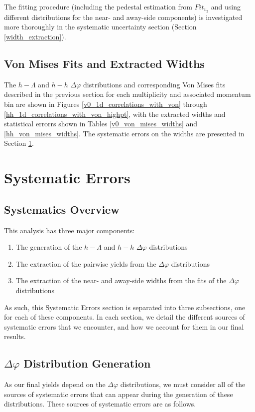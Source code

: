 \documentclass[ALICE,manyauthors]{ALICE_analysis_notes}
\begin{document}
The fitting procedure (including the pedestal estimation from $Fit_{v_{2}}$ and using different distributions for the near- and away-side components) is investigated more thoroughly in the systematic uncertainty section (Section \ref{width_extraction}).

\subsection{Von Mises Fits and Extracted Widths}
\label{von_mises_widths}
The $h-\Lambda$ and $h-h$ $\Delta\varphi$ distributions and corresponding Von Mises fits described in the previous section for each multiplicity and associated momentum bin are shown in Figures \ref{v0_1d_correlations_with_von} through \ref{hh_1d_correlations_with_von_highpt}, with the extracted widths and statistical errorrs shown in Tables \ref{v0_von_mises_widths} and \ref{hh_von_mises_widths}. The systematic errors on the widths are presented in Section \ref{systematics}.

\section{Systematic Errors}
\label{systematics}
\subsection{Systematics Overview}
This analysis has three major components:
\begin{enumerate}
\item The generation of the $h-\Lambda$ and $h-h$ $\Delta\varphi$ distributions
\item The extraction of the pairwise yields from the $\Delta\varphi$ distributions
\item The extraction of the near- and away-side widths from the fits of the $\Delta\varphi$ distributions
\end{enumerate}

As such, this Systematic Errors section is separated into three subsections, one for each of these components. In each section, we detail the different sources of systematic errors that we encounter, and how we account for them in our final results.


\subsection{$\Delta\varphi$ Distribution Generation}
As our final yields depend on the $\Delta\varphi$ distributions, we must consider all of the sources of systematic errors that can appear during the generation of these distributions. These sources of systematic errors are as follows.
\end{document}
